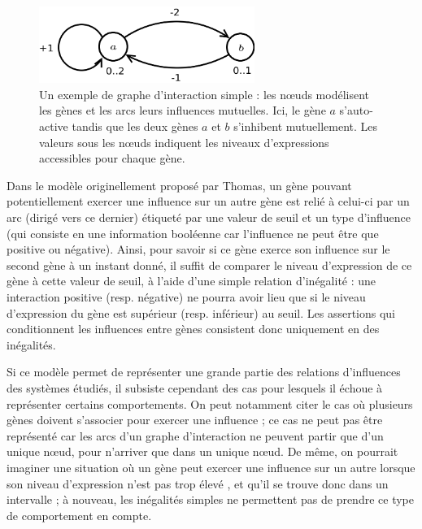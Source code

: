 \begin{figure}[ht]
  \centering\includegraphics[width=7cm]{figs/gi-sans-multiplexe}
  \caption{Un exemple de graphe d'interaction simple \cite{richard-comet-bernot-08} : les n\oe uds modélisent les gènes et les arcs leurs influences mutuelles. Ici, le gène $a$ s'auto-active tandis que les deux gènes $a$ et $b$ s'inhibent mutuellement. Les valeurs sous les n\oe uds indiquent les niveaux d'expressions accessibles pour chaque gène.}
  \label{rrg-gi-sans-multiplexe}
\end{figure}

Dans le modèle originellement proposé par Thomas, un gène pouvant potentiellement exercer une influence sur un autre gène est relié à celui-ci par un arc (dirigé vers ce dernier) étiqueté par une valeur de seuil et un type d'influence (qui consiste en une information booléenne car l'influence ne peut être que positive ou négative). Ainsi, pour savoir si ce gène exerce son influence sur le second gène à un instant donné, il suffit de comparer le niveau d'expression de ce gène à cette valeur de seuil, à l'aide d'une simple relation d'inégalité : une interaction positive (resp. négative) ne pourra avoir lieu que si le niveau d'expression du gène est supérieur (resp. inférieur) au seuil. Les assertions qui conditionnent les influences entre gènes consistent donc uniquement en des inégalités.

Si ce modèle permet de représenter une grande partie des relations d'influences des systèmes étudiés, il subsiste cependant des cas pour lesquels il échoue à représenter certains comportements. On peut notamment citer le cas où plusieurs gènes doivent s'associer pour exercer une influence ; ce cas ne peut pas être représenté car les arcs d'un graphe d'interaction ne peuvent partir que d'un unique n\oe ud, pour n'arriver que dans un unique n\oe ud. De même, on pourrait imaginer une situation où un gène peut exercer une influence sur un autre lorsque son niveau d'expression \og n'est pas trop élevé \fg, et qu'il se trouve donc dans un intervalle ; à nouveau, les inégalités simples ne permettent pas de prendre ce type de comportement en compte.

